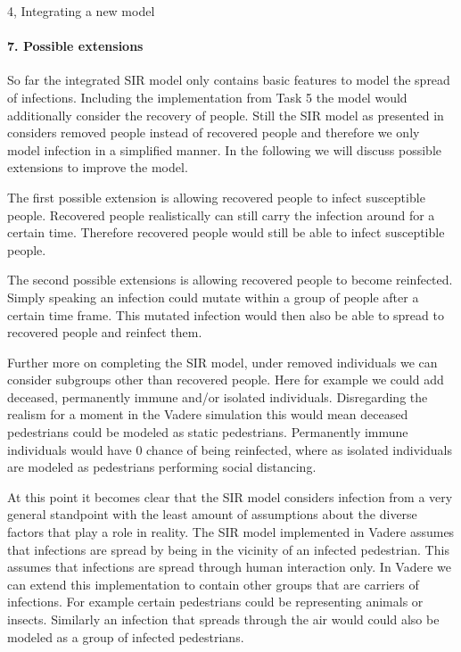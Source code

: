 \begin{task}{4, Integrating a new model}
\paragraph{7. Possible extensions}
So far the integrated SIR model only contains basic features to model the spread of infections. Including the implementation from Task 5 the model would additionally consider the recovery of people. Still the SIR model as presented in \cite{boccara2010model} considers removed people instead of recovered people and therefore we only model infection in a simplified manner. In the following we will discuss possible extensions to improve the model.

The first possible extension is allowing recovered people to infect susceptible people. Recovered people realistically can still carry the infection around for a certain time. Therefore recovered people would still be able to infect susceptible people.

The second possible extensions is allowing recovered people to become reinfected. Simply speaking an infection could mutate within a group of people after a certain time frame. This mutated infection would then also be able to spread to recovered people and reinfect them.

Further more on completing the SIR model, under removed individuals we can consider subgroups other than recovered people. Here for example we could add deceased, permanently immune and/or isolated individuals. Disregarding the realism for a moment in the Vadere simulation this would mean deceased pedestrians could be modeled as static pedestrians. Permanently immune individuals would have 0 chance of being reinfected, where as isolated individuals are modeled as pedestrians performing social distancing.

At this point it becomes clear that the SIR model considers infection from a very general standpoint with the least amount of assumptions about the diverse factors that play a role in reality. The SIR model implemented in Vadere assumes that infections are spread by being in the vicinity of an infected pedestrian. This assumes that infections are spread through human interaction only. In Vadere we can extend this implementation to contain other groups that are carriers of infections. For example certain pedestrians could  be representing animals or insects. Similarly an infection that spreads through the air would could also be modeled as a group of infected pedestrians.


\end{task}
